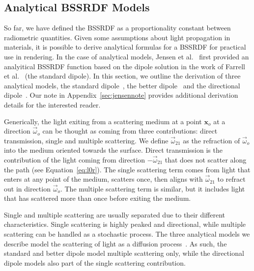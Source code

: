 \subsection{Analytical BSSRDF Models}

So far, we have defined the BSSRDF as a proportionality constant between radiometric quantities. Given some assumptions about light propagation in materials, it is possible to derive analytical formulas for a BSSRDF for practical use in rendering. In the case of analytical models, Jensen et al.~\cite{Jensen2001} first provided an analyitical BSSRDF function based on the dipole solution in the work of Farrell et al.~\cite{Farrell1992} (the standard dipole). In this section, we outline the derivation of three analytical models, the standard dipole~\cite{Jensen2001}, the better dipole~\cite{dEon2012} and the directional dipole~\cite{Frisvad2014}. Our note in Appendix~\ref{sec:jensennote} provides additional derivation details for the interested reader. 

Generically, the light exiting from a scattering medium at a point $\mathbf{x}_o$ at a direction $\vec{\omega}_o$ can be thought as coming from three contributions: direct transmission, single and multiple scattering. We define $\vec{\omega}_{21}$ as the refraction of $\vec{\omega}_o$ into the medium oriented towards the surface. Direct transmission is the contribution of the light coming from direction $-\vec{\omega}_{21}$ that does not scatter along the path (see Equation~\ref{eq:l0r}). The single scattering term comes from light that enters at any point of the medium, scatters once, then aligns with $\vec{\omega}_{21}$ to refract out in direction $\vec{\omega}_o$. The multiple scattering term is similar, but it includes light that has scattered more than once before exiting the medium. 

Single and multiple scattering are usually separated due to their different characteristics. Single scattering is highly peaked and directional, while multiple scattering can be handled as a stochastic process. The three analytical models we describe model the scattering of light as a diffusion process~\cite{Stam1995}. As such, the standard and better dipole model multiple scattering only, while the directional dipole models also part of the single scattering contribution. 

